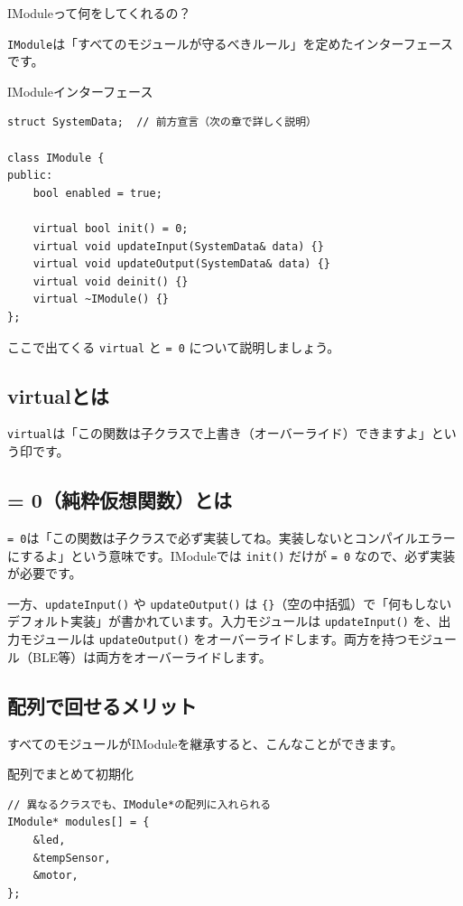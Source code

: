 \begin{qabox}{IModuleって何をしてくれるの？}

\texttt{IModule}は「すべてのモジュールが守るべきルール」を定めたインターフェースです。

\begin{goodexample}{IModuleインターフェース}
\begin{lstlisting}
struct SystemData;  // 前方宣言（次の章で詳しく説明）

class IModule {
public:
    bool enabled = true;

    virtual bool init() = 0;
    virtual void updateInput(SystemData& data) {}
    virtual void updateOutput(SystemData& data) {}
    virtual void deinit() {}
    virtual ~IModule() {}
};
\end{lstlisting}
\end{goodexample}

ここで出てくる \texttt{virtual} と \texttt{= 0} について説明しましょう。

\subsection{virtualとは}

\texttt{virtual}は「この関数は子クラスで上書き（オーバーライド）できますよ」という印です。

\subsection{= 0（純粋仮想関数）とは}

\texttt{= 0}は「この関数は子クラスで必ず実装してね。実装しないとコンパイルエラーにするよ」という意味です。IModuleでは \texttt{init()} だけが \texttt{= 0} なので、必ず実装が必要です。

一方、\texttt{updateInput()} や \texttt{updateOutput()} は \texttt{\{\}}（空の中括弧）で「何もしないデフォルト実装」が書かれています。入力モジュールは \texttt{updateInput()} を、出力モジュールは \texttt{updateOutput()} をオーバーライドします。両方を持つモジュール（BLE等）は両方をオーバーライドします。

\subsection{配列で回せるメリット}

すべてのモジュールがIModuleを継承すると、こんなことができます。

\begin{goodexample}{配列でまとめて初期化}
\begin{lstlisting}
// 異なるクラスでも、IModule*の配列に入れられる
IModule* modules[] = {
    &led,
    &tempSensor,
    &motor,
};


\end{lstlisting}
\end{goodexample}
\end{qabox}
